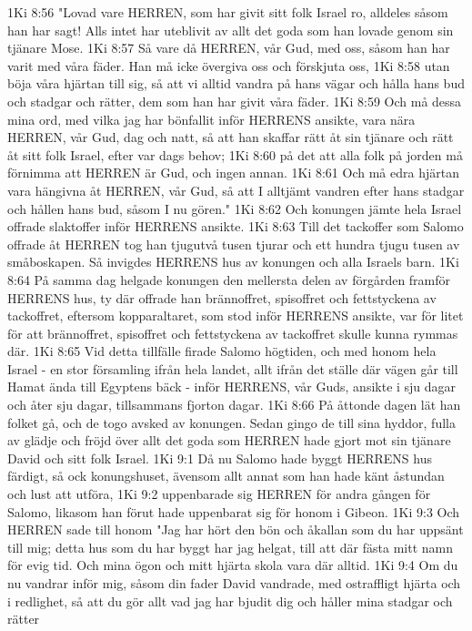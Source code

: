 1Ki 8:56  "Lovad vare HERREN, som har givit sitt folk Israel ro, alldeles såsom han har sagt! Alls intet har uteblivit av allt det goda som han lovade genom sin tjänare Mose.
1Ki 8:57  Så vare då HERREN, vår Gud, med oss, såsom han har varit med våra fäder. Han må icke övergiva oss och förskjuta oss,
1Ki 8:58  utan böja våra hjärtan till sig, så att vi alltid vandra på hans vägar och hålla hans bud och stadgar och rätter, dem som han har givit våra fäder.
1Ki 8:59  Och må dessa mina ord, med vilka jag har bönfallit inför HERRENS ansikte, vara nära HERREN, vår Gud, dag och natt, så att han skaffar rätt åt sin tjänare och rätt åt sitt folk Israel, efter var dags behov;
1Ki 8:60  på det att alla folk på jorden må förnimma att HERREN är Gud, och ingen annan.
1Ki 8:61  Och må edra hjärtan vara hängivna åt HERREN, vår Gud, så att I alltjämt vandren efter hans stadgar och hållen hans bud, såsom I nu gören."
1Ki 8:62  Och konungen jämte hela Israel offrade slaktoffer inför HERRENS ansikte.
1Ki 8:63  Till det tackoffer som Salomo offrade åt HERREN tog han tjugutvå tusen tjurar och ett hundra tjugu tusen av småboskapen. Så invigdes HERRENS hus av konungen och alla Israels barn.
1Ki 8:64  På samma dag helgade konungen den mellersta delen av förgården framför HERRENS hus, ty där offrade han brännoffret, spisoffret och fettstyckena av tackoffret, eftersom kopparaltaret, som stod inför HERRENS ansikte, var för litet för att brännoffret, spisoffret och fettstyckena av tackoffret skulle kunna rymmas där.
1Ki 8:65  Vid detta tillfälle firade Salomo högtiden, och med honom hela Israel - en stor församling ifrån hela landet, allt ifrån det ställe där vägen går till Hamat ända till Egyptens bäck - inför HERRENS, vår Guds, ansikte i sju dagar och åter sju dagar, tillsammans fjorton dagar.
1Ki 8:66  På åttonde dagen lät han folket gå, och de togo avsked av konungen. Sedan gingo de till sina hyddor, fulla av glädje och fröjd över allt det goda som HERREN hade gjort mot sin tjänare David och sitt folk Israel.
1Ki 9:1  Då nu Salomo hade byggt HERRENS hus färdigt, så ock konungshuset, ävensom allt annat som han hade känt åstundan och lust att utföra,
1Ki 9:2  uppenbarade sig HERREN för andra gången för Salomo, likasom han förut hade uppenbarat sig för honom i Gibeon.
1Ki 9:3  Och HERREN sade till honom "Jag har hört den bön och åkallan som du har uppsänt till mig; detta hus som du har byggt har jag helgat, till att där fästa mitt namn för evig tid. Och mina ögon och mitt hjärta skola vara där alltid.
1Ki 9:4  Om du nu vandrar inför mig, såsom din fader David vandrade, med ostraffligt hjärta och i redlighet, så att du gör allt vad jag har bjudit dig och håller mina stadgar och rätter
